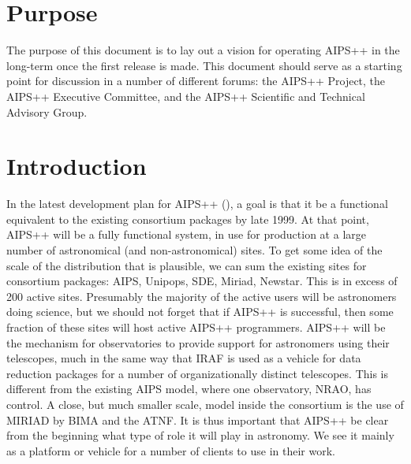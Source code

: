 \newcommand{\specsURL}{../../specs/specs.html}
\newcommand{\consortiumURL}{../consortium.html}
%
%

%


\section{Purpose}

The purpose of this document is to lay out a vision for operating
AIPS++ in the long-term once the first release is made. This document
should serve as a starting point for discussion in a number of
different forums: the AIPS++ Project, the AIPS++ Executive Committee,
and the AIPS++ Scientific and Technical Advisory Group.

\section{Introduction}

In the latest development plan for AIPS++ (), a goal is
that it be a functional equivalent to the existing consortium packages
by late 1999. At that point, AIPS++ will be a fully functional system,
in use for production at a large number of astronomical (and
non-astronomical) sites. To get some idea of the scale of the
distribution that is plausible, we can sum the existing sites for
consortium packages: AIPS, Unipops, SDE, Miriad, Newstar. This is in
excess of 200 active sites. Presumably the majority of the active
users will be astronomers doing science, but we should not forget that
if AIPS++ is successful, then some fraction of these sites will host
active AIPS++ programmers. AIPS++ will be the mechanism for
observatories to provide support for astronomers using their
telescopes, much in the same way that IRAF is used as a vehicle for
data reduction packages for a number of organizationally distinct
telescopes. This is different from the existing AIPS model, where one
observatory, NRAO, has control. A close, but much smaller scale, model
inside the consortium is the use of MIRIAD by BIMA and the ATNF.  It
is thus important that AIPS++ be clear from the beginning what type of
role it will play in astronomy. We see it mainly as a platform or
vehicle for a number of clients to use in their work.

